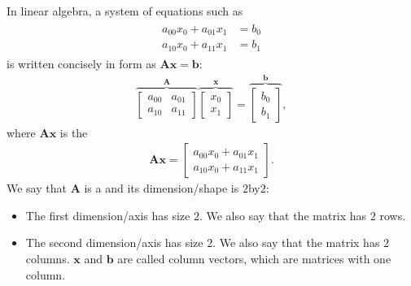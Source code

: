 \documentclass[letterpaper,10pt,english]{sphinxmanual}
\begin{document}
In linear algebra, a system of equations such as
\begin{equation*}
\begin{split} \begin{aligned}
a_{00} x_0 + a_{01} x_1 &= b_0\\
a_{10} x_0 + a_{11} x_1 &= b_1
\end{aligned}
\end{split}
\end{equation*}
is written concisely in  form as \( \mathbf{A} \mathbf{x} = \mathbf{b} \):
\begin{equation*}
\begin{split}\overbrace{\begin{bmatrix}
a_{00} & a_{01}\\
a_{10} & a_{11}
\end{bmatrix}}^{\mathbf{A}}
\overbrace{
\begin{bmatrix}
x_0\\
x_1
\end{bmatrix}}
^{\mathbf{x}}
= \overbrace{\begin{bmatrix}
b_0\\
b_1
\end{bmatrix}}^{\mathbf{b}},
\end{split}
\end{equation*}
where
\( \mathbf{A} \mathbf{x}\) is the 
\begin{equation*}
\begin{split} \mathbf{A} \mathbf{x} = \begin{bmatrix}
a_{00} x_0 + a_{01} x_1\\
a_{10} x_0 + a_{11} x_1
\end{bmatrix}.
\end{split}
\end{equation*}
We say that \(\mathbf{A}\) is a  and its dimension/shape is \(2\)\sphinxhyphen{}by\sphinxhyphen{}\(2\):
\begin{itemize}
\item {} 
The first dimension/axis has size \(2\). We also say that the matrix has \(2\) rows.

\item {} 
The second dimension/axis has size \(2\). We also say that the matrix has \(2\) columns.
\(\mathbf{x}\) and \(\mathbf{b}\) are called column vectors, which are matrices with one column.

\end{itemize}
\end{document}
